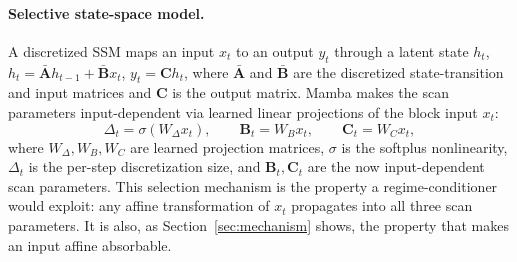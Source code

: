 \documentclass{article}
\begin{document}
\paragraph{Selective state-space model.} A discretized SSM maps an input $x_t$ to an output $y_t$ through a latent state $h_t$, $h_t = \bar{\mathbf{A}}h_{t-1} + \bar{\mathbf{B}}x_t$, $y_t = \mathbf{C}h_t$, where $\bar{\mathbf{A}}$ and $\bar{\mathbf{B}}$ are the discretized state-transition and input matrices and $\mathbf{C}$ is the output matrix. Mamba makes the scan parameters input-dependent via learned linear projections of the block input $x_t$:
\begin{equation}
\Delta_t = \sigma(W_\Delta x_t), \qquad \mathbf{B}_t = W_B x_t, \qquad \mathbf{C}_t = W_C x_t,
\end{equation}
where $W_\Delta, W_B, W_C$ are learned projection matrices, $\sigma$ is the softplus nonlinearity, $\Delta_t$ is the per-step discretization size, and $\mathbf{B}_t, \mathbf{C}_t$ are the now input-dependent scan parameters. This selection mechanism is the property a regime-conditioner would exploit: any affine transformation of $x_t$ propagates into all three scan parameters. It is also, as Section~\ref{sec:mechanism} shows, the property that makes an input affine absorbable.
\end{document}
